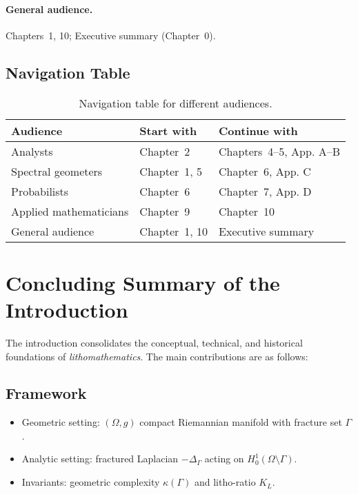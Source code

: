 \paragraph{General audience.}
Chapters~1, 10; Executive summary (Chapter~0).

\subsection{Navigation Table}

\begin{table}[h]
\centering
\begin{tabular}{|l|l|l|}
\hline
\textbf{Audience} & \textbf{Start with} & \textbf{Continue with} \\
\hline
Analysts & Chapter~2 & Chapters~4–5, App. A–B \\
Spectral geometers & Chapter~1, 5 & Chapter~6, App. C \\
Probabilists & Chapter~6 & Chapter~7, App. D \\
Applied mathematicians & Chapter~9 & Chapter~10 \\
General audience & Chapter~1, 10 & Executive summary \\
\hline
\end{tabular}
\caption{Navigation table for different audiences.}
\end{table}

\section{Concluding Summary of the Introduction}

The introduction consolidates the conceptual, technical, and historical
foundations of \emph{lithomathematics}. The main contributions are as follows:

\subsection{Framework}
\begin{itemize}
  \item Geometric setting: $(\Omega,g)$ compact Riemannian manifold with
  fracture set $\Gamma$.
  \item Analytic setting: fractured Laplacian $-\Delta_\Gamma$ acting on
  $H^1_0(\Omega\setminus\Gamma)$.
  \item Invariants: geometric complexity $\kappa(\Gamma)$ and litho-ratio $K_L$.
\end{itemize}


